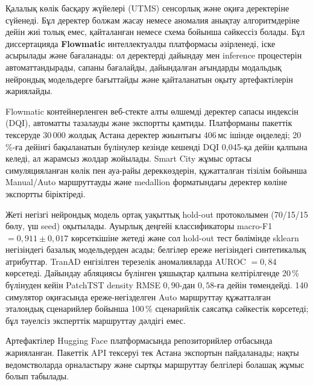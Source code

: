 Қалалық көлік басқару жүйелері (UTMS) сенсорлық және оқиға деректеріне сүйенеді. Бұл деректер болжам жасау немесе аномалия анықтау алгоритмдеріне дейін жиі толық емес, қайталанған немесе схема бойынша сәйкессіз болады. Бұл диссертацияда \textbf{Flowmatic} интеллектуалды платформасы әзірленеді, іске асырылады және бағаланады: ол деректерді дайындау мен inference процестерін автоматтандырады, сапаны бағалайды, дайындалған ағындарды модальдық нейрондық модельдерге бағыттайды және қайталанатын оқыту артефактілерін жариялайды.

Flowmatic контейнерленген веб-стекте алты өлшемді деректер сапасы индексін (DQI), автоматты тазалауды және экспортты қамтиды. Платформаны пакеттік тексеруде 30\,000 жолдық Астана деректер жиынтығы 406\,мс ішінде өңделеді; 20\,\%-ға дейінгі бақыланатын бүлінулер кезінде кешенді DQI 0{,}045-қа дейін қалпына келеді, ал жарамсыз жолдар жойылады. Smart City жұмыс ортасы симуляцияланған көлік пен ауа-райы дереккөздерін, құжатталған тізілім бойынша Manual/Auto маршруттауды және medallion форматындағы деректер көліне экспортты біріктіреді.

Жеті негізгі нейрондық модель ортақ уақыттық hold-out протоколымен (70/15/15 бөлу, үш seed) оқытылады. Ауырлық деңгейі классификаторы macro-F1 $= 0{,}911 \pm 0{,}017$ көрсеткішіне жетеді және сол hold-out тест бөлімінде sklearn негізіндегі базалық модельдерден асады; белгілер ереже негізіндегі синтетикалық атрибуттар. TranAD енгізілген терезелік аномалияларда AUROC $= 0{,}84$ көрсетеді. Дайындау абляциясы бүлінген ұяшықтар қалпына келтірілгенде 20\,\% бүлінуден кейін PatchTST density RMSE $0{,}90$-дан $0{,}58$-ға дейін төмендейді. 140 симулятор оқиғасында ереже-негізделген Auto маршруттау құжатталған эталондық сценарийлер бойынша 100\,\% сценарийлік саясатқа сәйкестік көрсетеді; бұл тәуелсіз эксперттік маршруттау дәлдігі емес.

Артефактілер Hugging Face платформасында \flowmaticrepo{} репозиторийлер отбасында жарияланған. Пакеттік API тексеруі тек Астана экспортын пайдаланады; нақты ведомстволарда орналастыру және сыртқы маршруттау белгілері болашақ жұмыс болып табылады.

